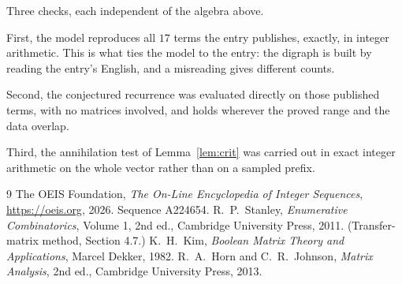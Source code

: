 \documentclass[11pt,a4paper]{article}
\theoremstyle{plain}
\theoremstyle{definition}
\begin{document}
Three checks, each independent of the algebra above.

First, the model reproduces all $17$ terms the entry publishes, exactly, in integer
arithmetic. This is what ties the model to the entry: the digraph is built by reading the
entry's English, and a misreading gives different counts.

Second, the conjectured recurrence was evaluated directly on those published terms, with no
matrices involved, and holds wherever the proved range and the data overlap.

Third, the annihilation test of Lemma~\ref{lem:crit} was carried out in exact integer
arithmetic on the whole vector rather than on a sampled prefix.

\begin{thebibliography}{9}
 The OEIS Foundation, \emph{The On-Line Encyclopedia of Integer
Sequences}, \url{https://oeis.org}, 2026. Sequence A224654.
 R.~P.~Stanley, \emph{Enumerative Combinatorics}, Volume 1, 2nd ed.,
Cambridge University Press, 2011. (Transfer-matrix method, Section 4.7.)
 K.~H.~Kim, \emph{Boolean Matrix Theory and Applications}, Marcel Dekker,
1982.
 R.~A.~Horn and C.~R.~Johnson, \emph{Matrix Analysis}, 2nd ed., Cambridge
University Press, 2013.
\end{thebibliography}
\end{document}

